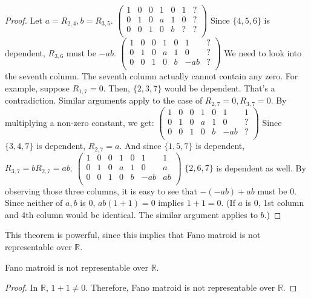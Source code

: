 \begin{proof}
Let $a = R_{2, 4}, b = R_{3, 5}$.
$\begin{pmatrix}
1 & 0 & 0 & 1 & 0 & 1 & ? \\
0 & 1 & 0 & a & 1 & 0 & ? \\
0 & 0 & 1 & 0 & b & ? & ? \\
\end{pmatrix}$
Since $\{4, 5, 6\}$ is dependent, $R_{3, 6}$ must be $-ab$.
$\begin{pmatrix}
1 & 0 & 0 & 1 & 0 & 1 & ? \\
0 & 1 & 0 & a & 1 & 0 & ? \\
0 & 0 & 1 & 0 & b & -ab & ? \\
\end{pmatrix}$
We need to look into the seventh column.
The seventh column actually cannot contain any zero.
For example, suppose $R_{1, 7} = 0$.
Then, $\{2, 3, 7 \}$ would be dependent.
That's a contradiction.
Similar arguments apply to the case of $R_{2, 7} = 0, R_{3, 7} = 0$.
By multiplying a non-zero constant, we get:
$\begin{pmatrix}
1 & 0 & 0 & 1 & 0 & 1 & 1 \\
0 & 1 & 0 & a & 1 & 0 & ? \\
0 & 0 & 1 & 0 & b & -ab & ? \\
\end{pmatrix}$
Since $\{3, 4, 7\}$ is dependent, $R_{2, 7} = a$.
And since $\{1, 5, 7\}$ is dependent, $R_{3, 7} = b R_{2, 7} = ab$.
$\begin{pmatrix}
1 & 0 & 0 & 1 & 0 & 1 & 1 \\
0 & 1 & 0 & a & 1 & 0 & a \\
0 & 0 & 1 & 0 & b & -ab & ab \\
\end{pmatrix}$
$\{ 2, 6, 7 \}$ is dependent as well.
By observing those three columns, it is easy to see that $-(-ab) + ab$ must be 0.
Since neither of $a, b$ is 0, $ab(1 + 1) = 0$ implies $1 + 1 = 0$.
(If $a$ is 0, 1st column and 4th column would be identical. The similar argument applies to $b$.)
\end{proof}

This theorem is powerful, since this implies that Fano matroid is not representable over $\mathbb{R}$.
\begin{cor}
Fano matroid is not representable over $\mathbb{R}$.
\end{cor}

\begin{proof}
In $\mathbb{R}$, $1 + 1 \neq 0$. Therefore, Fano matroid is not representable over $\mathbb{R}$.
\end{proof}


